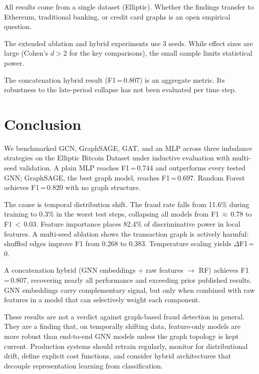 \documentclass[11pt]{article}
\begin{document}
All results come from a single dataset (Elliptic).  Whether the
findings transfer to Ethereum, traditional banking, or credit card
graphs is an open empirical question.

The extended ablation and hybrid experiments use 3 seeds.  While
effect sizes are large (Cohen's $d > 2$ for the key comparisons),
the small sample limits statistical power.

The concatenation hybrid result (F1\,=\,0.807) is an aggregate
metric.  Its robustness to the late-period collapse has not been
evaluated per time step.

\section{Conclusion}
\label{sec:conclusion}

We benchmarked GCN, GraphSAGE, GAT, and an MLP across three
imbalance strategies on the Elliptic Bitcoin Dataset under inductive
evaluation with multi-seed validation.  A plain MLP reaches
F1\,=\,0.744 and outperforms every tested GNN; GraphSAGE, the best
graph model, reaches F1\,=\,0.697.  Random Forest achieves
F1\,=\,0.820 with no graph structure.

The cause is temporal distribution shift.  The fraud rate falls from
11.6\% during training to 0.3\% in the worst test steps, collapsing
all models from F1\,$\approx$\,0.78 to F1\,$<$\,0.03.  Feature
importance places 82.4\% of discriminative power in local features.
A multi-seed ablation shows the transaction graph is actively
harmful: shuffled edges improve F1 from 0.268 to 0.383.  Temperature
scaling yields $\Delta$F1\,=\,0.

A concatenation hybrid (GNN embeddings + raw features $\to$ RF)
achieves F1\,=\,0.807, recovering nearly all performance and
exceeding prior published results.  GNN embeddings carry
complementary signal, but only when combined with raw features in a
model that can selectively weight each component.

These results are not a verdict against graph-based fraud detection
in general.  They are a finding that, on temporally shifting data,
feature-only models are more robust than end-to-end GNN models unless
the graph topology is kept current.  Production systems should
retrain regularly, monitor for distributional drift, define explicit
cost functions, and consider hybrid architectures that decouple
representation learning from classification.
\end{document}
